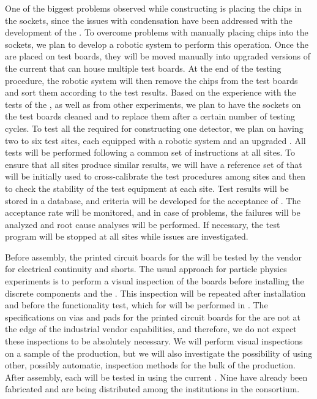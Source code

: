 One of the biggest problems observed while constructing
 is placing the chips in
the sockets, since the issues with condensation
have been addressed with the development of the .
To overcome problems with manually placing chips into
the sockets, we plan to develop a robotic system
to perform this operation. Once the  are 
placed on test boards, they will be moved manually into 
upgraded versions of the current  that can
house multiple test boards. At the end of the testing
procedure, the robotic system will then remove
the chips from the test boards and sort them according to
the test results. Based on the experience with the tests of
the  , as well as from other experiments,
we plan to have the sockets on the 
test boards cleaned and to replace them after a certain number of
testing cycles. To test all the  required for
constructing one  detector, we plan on having two to six test sites, each equipped with a
robotic system and an upgraded . All tests
will be performed following a common set of instructions
at all sites. To ensure that all sites produce similar
results, we will have a reference set of 
that will be initially used to cross-calibrate the 
test procedures among sites and then to check the 
stability of the test equipment at each site. Test results will
be stored in a database, and criteria will be developed
for the acceptance of . The acceptance rate 
will be monitored, and in case of problems,
the failures will be analyzed and root cause analyses
will be performed. If necessary,
the test program will be stopped at all sites while 
issues are investigated.

Before assembly, the printed circuit boards for the
 will be tested by the vendor for electrical
continuity and shorts. The usual approach for particle physics
experiments is to perform a visual inspection of the boards
before installing the discrete components and 
the . This inspection will be repeated after 
installation and before the functionality test, which for  will be performed in \lntwo. The
specifications on vias and pads for the printed circuit
boards for the  are not at the edge of the
industrial vendor capabilities, and therefore, we do not
expect these inspections to be absolutely necessary. We will
perform visual inspections on a sample of the 
production, but we will also investigate the possibility
of using other, possibly automatic, inspection methods for
the bulk of the production. After assembly, 
each  will be tested in \lntwo using
the current . Nine  have already been
fabricated and are being distributed among the institutions
in the consortium. 

